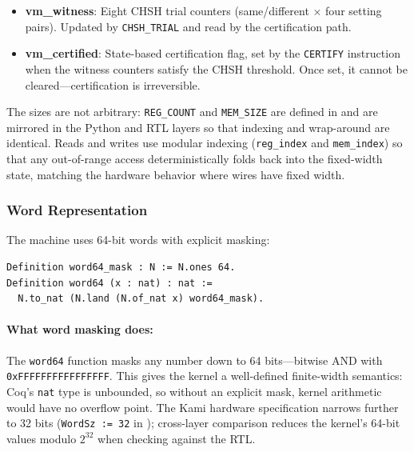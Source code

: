 \begin{itemize}
    \item \textbf{vm\_witness}: Eight CHSH trial counters (same/different $\times$ four setting pairs). Updated by \texttt{CHSH\_TRIAL} and read by the certification path.
    \item \textbf{vm\_certified}: State-based certification flag, set by the \texttt{CERTIFY} instruction when the witness counters satisfy the CHSH threshold. Once set, it cannot be cleared---certification is irreversible.
\end{itemize}
The sizes are not arbitrary: \texttt{REG\_COUNT} and \texttt{MEM\_SIZE} are defined in  and are mirrored in the Python and RTL layers so that indexing and wrap-around are identical. Reads and writes use modular indexing (\texttt{reg\_index} and \texttt{mem\_index}) so that any out-of-range access deterministically folds back into the fixed-width state, matching the hardware behavior where wires have fixed width.

\subsubsection{Word Representation}

The machine uses 64-bit words with explicit masking:
\begin{lstlisting}
Definition word64_mask : N := N.ones 64.
Definition word64 (x : nat) : nat :=
  N.to_nat (N.land (N.of_nat x) word64_mask).
\end{lstlisting}

\paragraph{What word masking does:} The \texttt{word64} function masks any number down to 64 bits---bitwise AND with \texttt{0xFFFFFFFFFFFFFFFF}. This gives the kernel a well-defined finite-width semantics: Coq's \texttt{nat} type is unbounded, so without an explicit mask, kernel arithmetic would have no overflow point. The Kami hardware specification narrows further to 32 bits (\texttt{WordSz := 32} in ); cross-layer comparison reduces the kernel's 64-bit values modulo $2^{32}$ when checking against the RTL.

